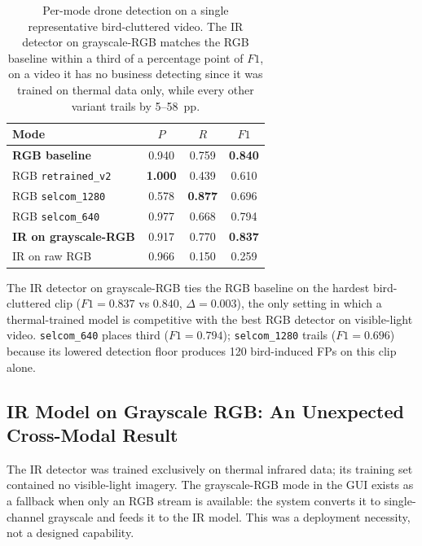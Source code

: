 \begin{table}[htbp]
    \centering
    \caption{Per-mode drone detection on a single representative bird-cluttered video. The IR detector on grayscale-RGB matches the RGB baseline within a third of a percentage point of $F1$, on a video it has no business detecting since it was trained on thermal data only, while every other variant trails by 5--58~pp.}
    \label{tab:realvideo_seagull}
    \begin{tabular}{lccc}
        \toprule
        Mode & $P$ & $R$ & $F1$ \\
        \midrule
        \textbf{RGB baseline}           & 0.940 & 0.759 & \textbf{0.840} \\
        RGB \texttt{retrained\_v2} & \textbf{1.000} & 0.439 & 0.610 \\
        RGB \texttt{selcom\_1280}  & 0.578 & \textbf{0.877} & 0.696 \\
        RGB \texttt{selcom\_640}   & 0.977 & 0.668 & 0.794 \\
        \textbf{IR on grayscale-RGB} & 0.917 & 0.770 & \textbf{0.837} \\
        IR on raw RGB          & 0.966 & 0.150 & 0.259 \\
        \bottomrule
    \end{tabular}
\end{table}

\noindent The IR detector on grayscale-RGB ties the RGB baseline on the hardest bird-cluttered clip ($F1 = 0.837$ vs $0.840$, $\Delta=0.003$), the only setting in which a thermal-trained model is competitive with the best RGB detector on visible-light video. \texttt{selcom\_640} places third ($F1=0.794$); \texttt{selcom\_1280} trails ($F1=0.696$) because its lowered detection floor produces 120 bird-induced FPs on this clip alone.

\subsection{IR Model on Grayscale RGB: An Unexpected Cross-Modal Result}
\label{sec:grayscale}

The IR detector was trained exclusively on thermal infrared data; its training set contained no visible-light imagery. The grayscale-RGB mode in the GUI exists as a fallback when only an RGB stream is available: the system converts it to single-channel grayscale and feeds it to the IR model. This was a deployment necessity, not a designed capability.

